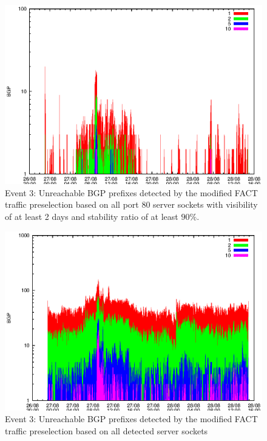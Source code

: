 \begin{figure}
	[p] \centering 
	\includegraphics[width=0.75\linewidth]{images/events/2010_08_27/bgp_log_port80_Set_stab_9_vts_2.eps}
	\caption{Event 3: Unreachable BGP prefixes detected by the modified FACT traffic preselection based on all port 80 server sockets with visibility of at least 2 days and stability ratio of at least $90\%$.} 
	\label{fig:RIPE_FACT_allSES80VTS2STAB9} 
\end{figure}

\begin{figure}
	[p] \centering 
	\includegraphics[width=0.75\linewidth]{images/events/2010_08_27/bgp_log_all_external.eps}
	\caption{Event 3: Unreachable BGP prefixes detected by the modified FACT traffic preselection based on all detected server sockets} 
	\label{fig:RIPE_FACT_allSES} 
\end{figure}

